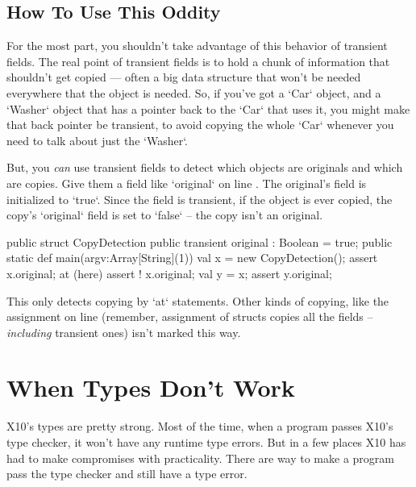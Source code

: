 \subsection{How To Use This Oddity}

For the most part, you shouldn't take advantage of this behavior of transient
fields.  The real point of transient fields is to hold a chunk of information
that shouldn't get copied --- often a big data structure that won't be needed
everywhere that the object is needed. So, if you've got a \xcd`Car` object,
and a \xcd`Washer` object that has a pointer back to the \xcd`Car` that uses
it,  you might make that back pointer be transient, to avoid copying the whole
\xcd`Car` whenever you need to talk about just the \xcd`Washer`. 

But, you {\em can} use transient fields to detect which objects are originals
and which are copies. 
Give them a field like \xcd`original` on line .  
The original's field is initialized to \xcd`true`.    Since the field is
transient, if the object is ever copied, the copy's \xcd`original` field is
set to \xcd`false` -- the copy isn't an original.
\begin{xtennum}[]
public struct CopyDetection {
  public transient original : Boolean = true; 
  public static def main(argv:Array[String](1)) {
     val x = new CopyDetection();
     assert x.original;  
     at (here) {
       assert ! x.original; 
     }
     val y = x;
     assert y.original; 
  }
}
\end{xtennum}

This only detects copying by \xcd`at` statements.  Other kinds of copying,
like the assignment on line  (remember, assignment of
structs copies all the fields -- {\em including} transient ones) isn't marked
this way.  




\section{When Types Don't Work}

X10's types are pretty strong.  Most of the time, when a program passes X10's
type checker, it won't have any runtime type errors.  But in a few places X10
has had to make compromises with practicality. There are way to make a program
pass the type checker and still have a type error.

